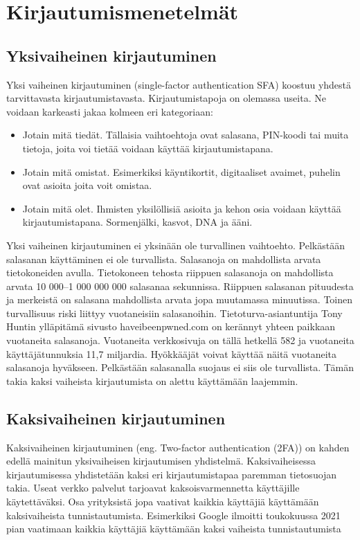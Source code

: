 \chapter{Kirjautumismenetelmät\label{kirjautumismenetelmät}}

\section{Yksivaiheinen kirjautuminen}

Yksi vaiheinen kirjautuminen (single-factor authentication SFA) koostuu yhdestä tarvittavasta kirjautumistavasta. Kirjautumistapoja on olemassa useita. Ne voidaan karkeasti jakaa kolmeen eri kategoriaan: 

\begin{itemize}
    \item Jotain mitä tiedät. Tällaisia vaihtoehtoja ovat salasana, PIN-koodi tai muita tietoja, joita voi tietää voidaan käyttää kirjautumistapana.
    \item Jotain mitä omistat. Esimerkiksi käyntikortit, digitaaliset avaimet, puhelin ovat asioita joita voit omistaa.
    \item Jotain mitä olet. Ihmisten yksilöllisiä asioita ja kehon osia voidaan käyttää kirjautumistapana. Sormenjälki, kasvot, DNA ja ääni.
\end{itemize}
Yksi vaiheinen kirjautuminen ei yksinään ole turvallinen vaihtoehto. Pelkästään salasanan käyttäminen ei ole turvallista. Salasanoja on mahdollista arvata tietokoneiden avulla. Tietokoneen tehosta riippuen salasanoja on mahdollista arvata 10 000–1 000 000 000 salasanaa sekunnissa. Riippuen salasanan pituudesta ja merkeistä on salasana mahdollista arvata jopa muutamassa minuutissa. \citep{brute_force_attack} Toinen turvallisuus riski liittyy vuotaneisiin salasanoihin. Tietoturva-asiantuntija Tony Huntin ylläpitämä sivusto haveibeenpwned.com on kerännyt yhteen paikkaan vuotaneita salasanoja. Vuotaneita verkkosivuja on tällä hetkellä 582 ja vuotaneita käyttäjätunnuksia 11,7 miljardia. \citep{Have_i_been_pwned} Hyökkääjät voivat käyttää näitä vuotaneita salasanoja hyväkseen. Pelkästään salasanalla suojaus ei siis ole turvallista. Tämän takia kaksi vaiheista kirjautumista on alettu käyttämään laajemmin. 

\section{Kaksivaiheinen kirjautuminen}
Kaksivaiheinen kirjautuminen (eng. Two-factor authentication (2FA)) on kahden edellä mainitun yksivaiheisen kirjautumisen yhdistelmä. Kaksivaiheisessa kirjautumisessa yhdistetään kaksi eri kirjautumistapaa paremman tietosuojan takia. 
Useat verkko palvelut tarjoavat kaksoisvarmennetta käyttäjille käytettäväksi. Osa yrityksistä jopa vaativat kaikkia käyttäjiä käyttämään kaksivaiheista tunnistautumista. Esimerkiksi Google ilmoitti toukokuussa 2021 pian vaatimaan kaikkia käyttäjiä käyttämään kaksi vaiheista tunnistautumista \citep{future_without_passwords}

